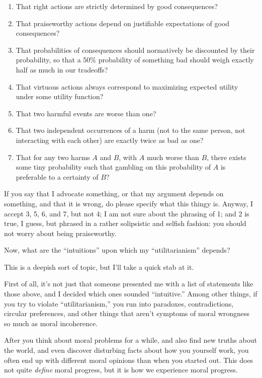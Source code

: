 \begin{enumerate}
\item  That right actions are strictly determined by good consequences?
\item  That praiseworthy actions depend on justifiable expectations of
good consequences?
\item  That probabilities of consequences should normatively be
discounted by their probability, so that a 50\% probability of
something bad should weigh exactly half as much in our tradeoffs?
\item  That virtuous actions always correspond to maximizing expected
utility under some utility function?
\item  That two harmful events are worse than one?
\item  That two independent occurrences of a harm (not to the same
person, not interacting with each other) are exactly twice as bad as
one?
\item  That for any two harms $A$ and $B$, with $A$ much worse than $B$, there
exists some tiny probability such that gambling on this probability of
$A$ is preferable to a certainty of $B$?
\end{enumerate}


 If you say that I advocate something, or that my argument depends
on something, and that it is wrong, do please specify what this thingy
is. Anyway, I accept 3, 5, 6, and 7, but not 4; I am not sure about the
phrasing of 1; and 2 is true, I guess, but phrased in a rather
solipsistic and selfish fashion: you should not worry about being
praiseworthy.


 Now, what are the
``intuitions'' upon which my
``utilitarianism'' depends?


 This is a deepish sort of topic, but I'll take a
quick stab at it.


 First of all, it's not just that someone presented
me with a list of statements like those above, and I decided which ones
sounded ``intuitive.'' Among other
things, if you try to violate
``utilitarianism,'' you run into
paradoxes, contradictions, circular preferences, and other things that
aren't symptoms of moral wrongness so much as moral
incoherence.


 After you think about moral problems for a while, and also find
new truths about the world, and even discover disturbing facts about
how you yourself work, you often end up with different moral opinions
than when you started out. This does not quite \textit{define} moral
progress, but it is how we experience moral progress.


